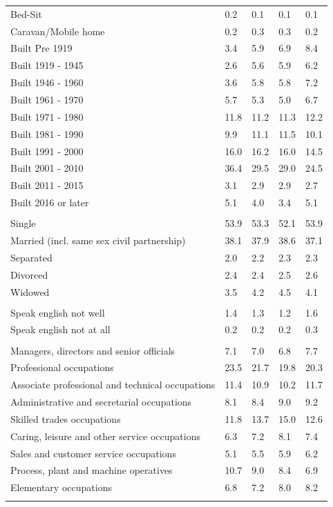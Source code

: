 \documentclass{article}
\begin{document}
\begin{table}[h]
\begin{tabular}{KTTTT}
Bed-Sit & 0.2& 0.1& 0.1& 0.1\\
Caravan/Mobile home & 0.2& 0.3& 0.3& 0.2\\
    \hline
Built Pre 1919 & 3.4& 5.9& 6.9& 8.4\\
Built 1919 - 1945 & 2.6& 5.6& 5.9& 6.2\\
Built  1946 - 1960 & 3.6& 5.8& 5.8& 7.2\\
Built  1961 - 1970 & 5.7& 5.3& 5.0& 6.7\\
Built  1971 - 1980 & 11.8& 11.2& 11.3& 12.2\\
Built  1981 - 1990 &  9.9& 11.1& 11.5& 10.1\\
Built  1991 - 2000 & 16.0& 16.2& 16.0& 14.5\\
Built  2001 - 2010 & 36.4& 29.5& 29.0& 24.5\\
Built  2011 - 2015 & 3.1& 2.9& 2.9& 2.7\\
Built  2016 or later & 5.1& 4.0& 3.4& 5.1\\
\hline
    \\
    \hline
Single & 53.9& 53.3& 52.1& 53.9\\
Married (incl. same sex civil partnership) & 38.1& 37.9& 38.6& 37.1\\
Separated  & 2.0& 2.2& 2.3& 2.3\\
Divorced  & 2.4& 2.4& 2.5& 2.6\\
Widowed & 3.5& 4.2& 4.5& 4.1\\
\hline
    \\ 
    \hline
Speak english not well & 1.4& 1.3& 1.2& 1.6\\
Speak english not at all & 0.2& 0.2& 0.2& 0.3\\
\hline
    \\
    \hline
Managers, directors and senior officials & 7.1& 7.0& 6.8& 7.7\\
Professional occupations & 23.5& 21.7& 19.8& 20.3\\
Associate professional and technical occupations & 11.4& 10.9& 10.2& 11.7\\
Administrative and secretarial occupations & 8.1& 8.4& 9.0& 9.2\\
Skilled trades occupations & 11.8& 13.7& 15.0& 12.6\\
Caring, leisure and other service occupations & 6.3& 7.2& 8.1& 7.4\\
Sales and customer service occupations & 5.1& 5.5& 5.9& 6.2\\
Process, plant and machine operatives & 10.7&  9.0&  8.4&  6.9\\
Elementary occupations & 6.8& 7.2& 8.0& 8.2\\
\hline
\end{tabular}
\end{table}
\end{document}
